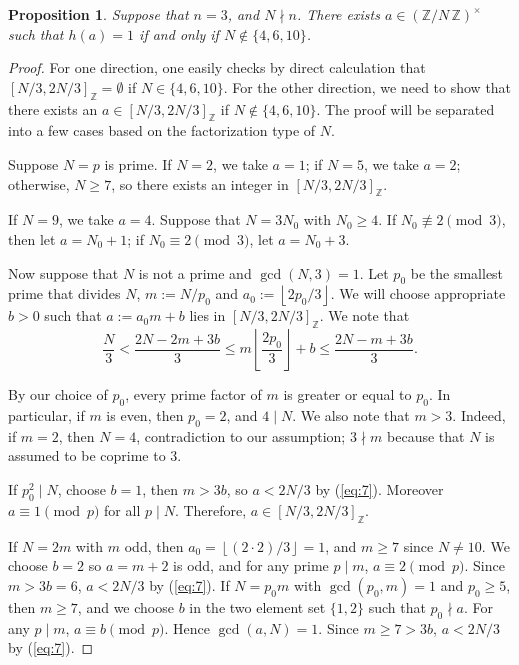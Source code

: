 \documentclass{amsart}[11pt]
\newtheorem{prop}[thm]{Proposition}
\theoremstyle{definition}
\numberwithin{equation}{section}
\theoremstyle{notitle}
\begin{document}
\begin{prop} \label{prop:exist-value-one} Suppose that $n=3$, and
  $N\nmid n$. There exists $a\in {(\mathbb{Z}/ {N}\, \mathbb{Z})^\times}$ such that $h(a)=1$ if and
  only if $N\not\in \{4, 6, 10\}$. 
\end{prop}
\begin{proof}
  For one direction, one easily checks by direct calculation that
  $[N/3, 2N/3]_{\mathbb{Z}}=\emptyset$ if $N\in \{4, 6, 10\}$. For the other
  direction, we need to show that there exists an $a\in [N/3,
  2N/3]_{\mathbb{Z}}$ if $N\not\in \{4, 6, 10\}$.  The proof will be separated
  into a few cases based on the factorization type of $N$.

Suppose $N=p$ is prime. If $N=2$, we take $a=1$; if $N=5$, we take
$a=2$; otherwise, $N\geq 7$, so there exists an integer in $[N/3, 2N/3]_{\mathbb{Z}}$.  

If $N=9$, we take $a=4$. Suppose that $N=3N_0$ with $N_0\geq 4$.  If
$N_0 \not\equiv 2 \pmod{3}$, then let $a=N_0+1$; if $N_0 \equiv 2
\pmod{3}$, let $a=N_0+3$.

Now suppose that $N$ is not a prime and $\gcd(N, 3)=1$. Let $p_0$ be the
smallest prime that divides $N$, $m:=N/p_0$ and $a_0:={\left\lfloor {2p_0/3} \right\rfloor}$.
We will choose appropriate $b>0$ such that $a:= a_0m+b$ lies in $[N/3, 2N/3]_{\mathbb{Z}}$.  We note that
\begin{equation}
  \label{eq:7}
\frac{N}{3}<\frac{2N-2m+3b}{3} \leq m{\left\lfloor {\frac{2p_0}{3}} \right\rfloor}+b \leq
\frac{2N-m+3b}{3}. 
\end{equation}

 By our choice of $p_0$, every prime factor of $m$ is greater or equal
 to $p_0$. In particular, if $m$ is even, then $p_0=2$, and $4\mid
 N$. We also note that $m>3$. Indeed, if $m=2$, then $N=4$,
 contradiction to our assumption; $3\nmid m$ because that $N$ is
 assumed to be coprime to $3$.

 If $p_0^2\mid N$, choose $b=1$, then $m>3b$, so $a<2N/3$ by
 (\ref{eq:7}). Moreover $a\equiv 1 \pmod{p}$ for all $p\mid
 N$. Therefore, $a \in [N/3, 2N/3]_{\mathbb{Z}}$.

If $N=2m$ with $m$ odd, then $a_0={\left\lfloor {(2\cdot 2)/3} \right\rfloor}=1$, and $m\geq 7$
since $N\neq 10$. We choose $b=2$ so $a=m+2$ is odd, and for any prime
$p\mid m$, $a\equiv 2 \pmod{p}$.  Since $m> 3b=6$, $a<2N/3$ by
(\ref{eq:7}). If $N=p_0m$ with $\gcd(p_0, m)=1$ and $p_0\geq 5$, then
$m\geq 7$, and we choose $b$ in the two element set $\{1, 2\}$ such
that $p_0\nmid a$. For any $p\mid m$, $a \equiv b \pmod{p}$. Hence
$\gcd(a, N)=1$. Since $m\geq 7> 3b$, $a<2N/3$ by (\ref{eq:7}).
\end{proof}
\end{document}
